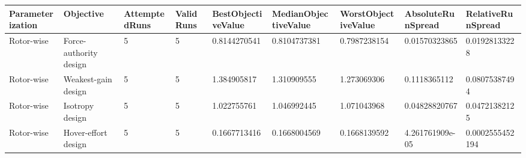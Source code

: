 \begin{tabular}{@{}lllllllll@{}}
\toprule
Parameterization & Objective & AttemptedRuns & ValidRuns & BestObjectiveValue & MedianObjectiveValue & WorstObjectiveValue & AbsoluteRunSpread & RelativeRunSpread \\
\midrule
Rotor-wise & Force-authority design & 5 & 5 & 0.8144270541 & 0.8104737381 & 0.7987238154 & 0.01570323865 & 0.01928133228 \\
Rotor-wise & Weakest-gain design & 5 & 5 & 1.384905817 & 1.310909555 & 1.273069306 & 0.1118365112 & 0.08075387494 \\
Rotor-wise & Isotropy design & 5 & 5 & 1.022755761 & 1.046992445 & 1.071043968 & 0.04828820767 & 0.04721382125 \\
Rotor-wise & Hover-effort design & 5 & 5 & 0.1667713416 & 0.1668004569 & 0.1668139592 & 4.261761909e-05 & 0.0002555452194 \\
\bottomrule
\end{tabular}
